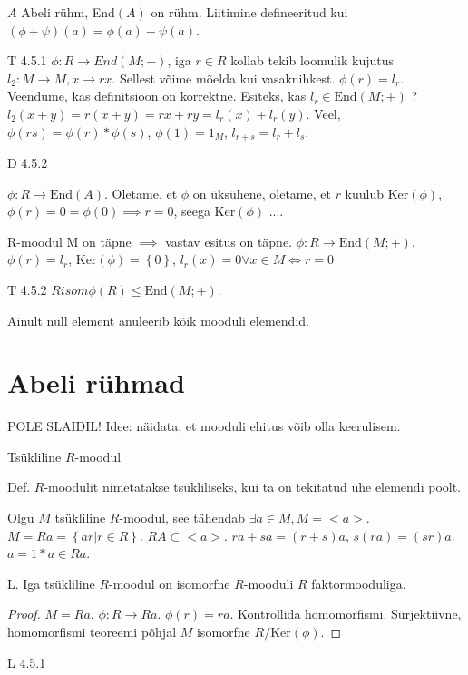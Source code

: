 \documentclass[12pt]{report}
\numberwithin{equation}{section}
\theoremstyle{definition}
\theoremstyle{plain}
\begin{document}
$A$ Abeli r\"uhm, End$(A)$ on r\"uhm. Liitimine defineeritud kui $\left( \phi + \psi \right) \left( a \right) = \phi \left( a \right) + \psi \left( a \right)$. 

T 4.5.1
$\phi : R \to End(M;+)$, iga $r \in R$ kollab tekib loomulik kujutus $l_2: M \to M, x \to rx$. Sellest võime mõelda kui vasaknihkest.  $\phi \left( r \right ) = l_r$. Veendume, kas definitsioon on korrektne. Esiteks, kas $l_r \in \text{End}(M;+)$ ? $l_2 (x +y ) = r (x + y ) = rx + ry = l_r(x) + l_r(y)$. Veel, $\phi(rs) = \phi(r) * \phi(s)$, $\phi(1) = 1_M$, $l_{r+s} = l_r + l_s$.

D 4.5.2

$\phi: R \to \text{End}(A)$. Oletame, et $\phi$ on \"uks\"uhene, oletame, et $r$ kuulub Ker$(\phi)$, $\phi(r) = 0 = \phi(0) \implies r=0$, seega Ker$(\phi)$  ....

R-moodul M on täpne $\implies$ vastav esitus on täpne. $\phi : R \to \text{End}(M;+)$, $\phi(r) = l_r$, Ker$(\phi) = \left\{ 0 \right\}$, $l_r(x) = 0 \forall x \in M \iff r=0$

T 4.5.2
$R isom \phi(R) \leq \text{End} \left( M;+ \right)$.

Ainult null element anuleerib kõik mooduli elemendid. 

\section{Abeli r\"uhmad}
POLE SLAIDIL! 
Idee: näidata, et mooduli ehitus võib olla keerulisem. 

Tsükliline $R$-moodul 

Def. $R$-moodulit nimetatakse ts\"ukliliseks, kui ta on tekitatud \"uhe elemendi poolt. 

Olgu $M$ ts\"ukliline $R$-moodul, see tähendab $\exists a \in M, M = < a >$. $M = Ra = \left\{ ar | r \in R \right\}$. $RA \subset < a > $. $ra + sa = (r + s) a$, $s(ra) = (sr)a$. $a = 1 * a \in Ra$. 

L. Iga ts\"ukliline $R$-moodul on isomorfne $R$-mooduli $R$ faktormooduliga. 

\begin{proof}
$M = Ra$.
$\phi: R \to Ra$.
$\phi(r) = ra$.
Kontrollida homomorfismi. S\"urjektiivne, homomorfismi teoreemi põhjal $M$ isomorfne $R/ \text{Ker} \left( \phi \right)$.

\end{proof}



L 4.5.1

\end{document}
